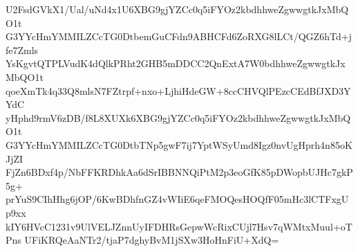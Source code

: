 U2FsdGVkX1/Ual/uNd4x1U6XBG9gjYZCc0q5iFYOz2kbdhhweZgwwgtkJxMbQO1t
G3YYcHmYMMILZCcTG0DtbemGuCFdn9ABHCFd6ZoRXG8lLCt/QGZ6hTd+jfe7Zmls
YsKgvtQTPLVudK4dQlkPRht2GHB5mDDCC2QnExtA7W0bdhhweZgwwgtkJxMbQO1t
qoeXmTk4q33Q8mlsN7FZtrpf+nxo+LjhiHdeGW+8ccCHVQlPEzcCEdBfJXD3YYdC
yHphd9rmV6zDB/f8L8XUXk6XBG9gjYZCc0q5iFYOz2kbdhhweZgwwgtkJxMbQO1t
G3YYcHmYMMILZCcTG0DtbTNp5gwF7ij7YptWSyUmd8Igz0nvUgHprh4n85oKJjZI
FjZn6BDxf4p/NbFFKRDhkAa6dSrIBBNNQiPtM2p3eoGfK85pDWopbUJHc7gkP5g+
prYuS9CIhHhg6jOP/6KwBDhfnGZ4vWIiE6qeFMOQesHOQfF05mHc3lCTFxgUp9xx
kIY6HVcC1231v9UlVELJZnnUyIFDHRsGepwWcRixCUjl7Hsv7qWMtxMuul+oTPns
UFiKRQeAaNTr2/tjaP7dghyBvM1jSXw3HoHnFiU+XdQ=
